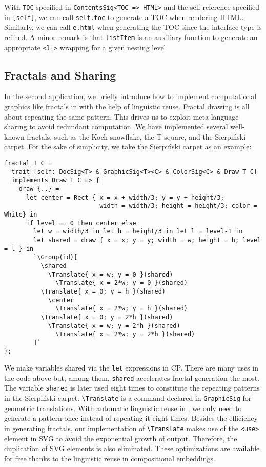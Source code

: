 \noindent With \lstinline{TOC} specified in \lstinline{ContentsSig<TOC => HTML>}
and the self-reference specified in \lstinline{[self]}, we can call
\lstinline{self.toc} to generate a TOC when rendering HTML. Similarly, we can
call \lstinline{e.html} when generating the TOC since the interface type is
refined. A minor remark is that \lstinline{listItem} is an auxiliary function to
generate an appropriate \lstinline{<li>} wrapping for a given nesting level.

\subsection{Fractals and Sharing}

In the second application, we briefly introduce how to implement computational
graphics like fractals in \ExT with the help of linguistic reuse. Fractal
drawing is all about repeating the same pattern. This drives us to exploit
meta-language sharing to avoid redundant computation. We have implemented
several well-known fractals, such as the Koch snowflake, the T-square, and the
Sierpiński carpet. For the sake of simplicity, we take the Sierpiński carpet as
an example:

\begin{lstlisting}
fractal T C =
  trait [self: DocSig<T> & GraphicSig<T><C> & ColorSig<C> & Draw T C]
  implements Draw T C => {
    draw {..} =
      let center = Rect { x = x + width/3; y = y + height/3;
                          width = width/3; height = height/3; color = White} in
      if level == 0 then center else
        let w = width/3 in let h = height/3 in let l = level-1 in
        let shared = draw { x = x; y = y; width = w; height = h; level = l } in
        `\Group(id)[
          \shared
            \Translate{ x = w; y = 0 }(shared)
              \Translate{ x = 2*w; y = 0 }(shared)
          \Translate{ x = 0; y = h }(shared)
            \center
              \Translate{ x = 2*w; y = h }(shared)
          \Translate{ x = 0; y = 2*h }(shared)
            \Translate{ x = w; y = 2*h }(shared)
              \Translate{ x = 2*w; y = 2*h }(shared)
        ]`
};
\end{lstlisting}

\noindent We make variables shared via the \lstinline{let} expressions in CP.
There are many uses in the code above but, among them, \lstinline{shared}
accelerates fractal generation the most. The variable \lstinline{shared} is
later used eight times to constitute the repeating patterns in the Sierpiński
carpet. \lstinline{\Translate} is a command declared in \lstinline{GraphicSig}
for geometric translations. With automatic linguistic reuse in \ExT, we only
need to generate a pattern once instead of repeating it eight times. Besides the
efficiency in generating fractals, our implementation of \lstinline{\Translate}
makes use of the \lstinline{<use>} element in SVG to avoid the exponential
growth of output. Therefore, the duplication of SVG elements is also eliminated.
These optimizations are available for free thanks to the linguistic reuse in
compositional embeddings.

